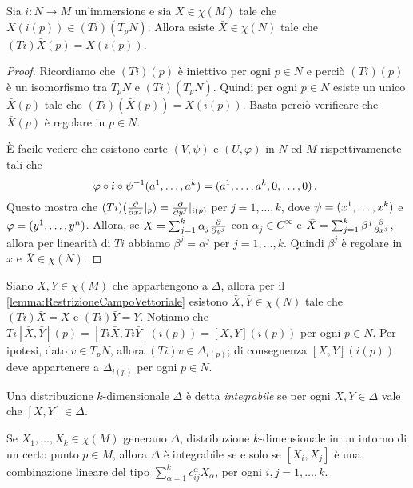 \begin{lemma}\label{lemma:RestrizioneCampoVettoriale}
	Sia $i:N\to M$ un'immersione e sia $X\in\chi(M)$ tale che
	$X(i(p))\in (Ti)(T_pN)$. Allora esiste $\bar X\in\chi(N)$ tale che $(Ti)\bar X (p) = X(i(p))$.
\end{lemma}

\begin{proof}
	Ricordiamo che $(Ti)(p)$ è iniettivo per ogni $p\in N$ e perciò $(Ti)(p)$ è un isomorfismo tra $T_pN$ e $(Ti)(T_pN)$. Quindi per ogni $p\in N$ esiste un unico $\bar X(p)$ tale che $(Ti)(\bar X(p)) = X(i(p))$. Basta perciò verificare che $\bar X(p)$ è regolare in $p\in N$.
	
	È facile vedere che esistono carte $(V,\psi)$ e $(U,\varphi)$ in $N$ ed $M$ rispettivamenete tali che
	\begin{equation*}
	\varphi\circ i \circ\psi^{-1}(a^1,\ldots, a^k) = (a^1,\ldots,a^k,0,\ldots,0)\punto
	\end{equation*}
	Questo mostra che $(Ti)(\DerParz{}{x^j}\restrict{p}) = \DerParz{}{y^j}\restrict{i(p)}$ per $j=1,\ldots,k$, dove $\psi = (\seqa xk,)$ e $\varphi = (\seqa yn,)$.
	Allora, se $X=\sum_{j=1}^k\alpha_j\DerParz{}{y^j}$ con $\alpha_j\in C^\infty$ e $\bar X = \sum_{j=1}^k\beta^j\DerParz{}{x^j}$, allora per linearità di $Ti$ abbiamo $\beta^j=\alpha^j$ per $j=1,\ldots,k$. Quindi $\beta^j$ è regolare in $x$ e $\bar X\in\chi(N)$.
\end{proof}

Siano $X,Y\in\chi(M)$ che appartengono a $\Delta$, allora per il \cref{lemma:RestrizioneCampoVettoriale} esistono $\bar X,\bar Y\in\chi(N)$ tale che $(Ti)\bar X=X$ e $(Ti)\bar Y=Y$.
Notiamo che $Ti[\bar X,\bar Y](p) = [Ti\bar X,Ti\bar Y](i(p)) = [X,Y] (i(p))$ per ogni $p\in N$. Per ipotesi, dato $v\in T_pN$, allora $(Ti)v\in\Delta_{i(p)}$; di conseguenza $[X,Y](i(p))$ deve appartenere a $\Delta_{i(p)}$ per ogni $p\in N$. %

\begin{definition} 
	Una distribuzione $k$-dimensionale $\Delta$ è detta \emph{integrabile} se per ogni $X,Y\in\Delta$ vale che $[X,Y]\in\Delta$.
\end{definition}

\begin{proposition} \label{prop:CondizioneIntegrabilitaDistribuzioniDaGeneratori}
	Se $X_1,\ldots,X_k\in\chi(M)$ generano $\Delta$, distribuzione $k$-dimensionale in un intorno di un certo punto $p\in M$, allora $\Delta$ è integrabile se e solo se $[X_i,X_j]$ è una combinazione lineare del tipo $\sum_{\alpha=1}^kc_{ij}^\alpha X_\alpha$, per ogni $i,j=1,\ldots,k$.
\end{proposition}


